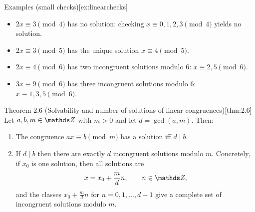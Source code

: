 \documentclass[10pt]{article}
\theoremstyle{definition}
\theoremstyle{plain}
\numberwithin{equation}{section}
\begin{document}
\begin{define}{Examples (small checks)}[ex:linearchecks]
\begin{itemize}
  \item $2x\equiv 3\pmod{4}$ has no solution: checking $x\equiv0,1,2,3\pmod{4}$ yields no solution.
  \item $2x\equiv 3\pmod{5}$ has the unique solution $x\equiv 4\pmod{5}$.
  \item $2x\equiv 4\pmod{6}$ has two incongruent solutions modulo $6$: $x\equiv 2,5\pmod{6}$.
  \item $3x\equiv 9\pmod{6}$ has three incongruent solutions modulo $6$: $x\equiv 1,3,5\pmod{6}$.
\end{itemize}
\end{define}

\begin{define}{Theorem 2.6 (Solvability and number of solutions of linear congruences)}[thm:2.6]
Let $a,b,m\in\setZ$ with $m>0$ and let $d=\gcd(a,m)$. Then:
\begin{enumerate}
  \item The congruence $ax\equiv b\pmod{m}$ has a solution iff $d\mid b$.
  \item If $d\mid b$ then there are exactly $d$ incongruent solutions modulo $m$. Concretely,
    if $x_0$ is one solution, then all solutions are
    \[
    x = x_0 + \frac{m}{d}n,\qquad n\in\setZ,
    \]
    and the classes $x_0+\frac{m}{d}n$ for $n=0,1,\dots,d-1$ give a complete set of
    incongruent solutions modulo $m$.
\end{enumerate}
\end{define}
\end{document}
